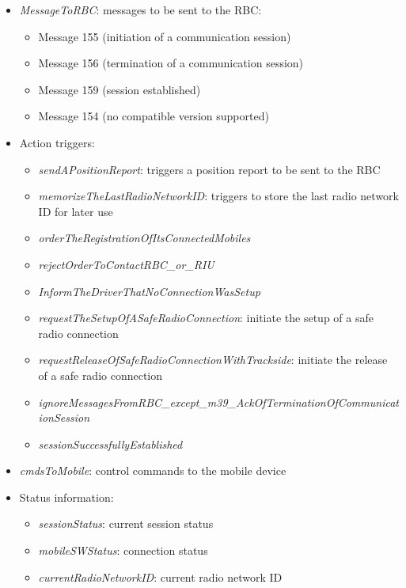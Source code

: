 \begin{itemize}
 \item \textit{MessageToRBC}: messages to be sent to the RBC: 

  \begin{itemize}
   \item Message 155 (initiation of a communication session)
   \item Message 156 (termination of a communication session)
   \item Message 159 (session established)
   \item Message 154 (no compatible version supported) 
  \end{itemize}

 \item Action triggers: 
 
  \begin{itemize}
   \item \textit{sendAPositionReport}: triggers a position report to be sent to the RBC
   \item \textit{memorizeTheLastRadioNetworkID}: triggers to store the last radio network ID for later use
   \item \textit{orderTheRegistrationOfItsConnectedMobiles}
   \item \textit{rejectOrderToContactRBC\_or\_RIU}
   \item \textit{InformTheDriverThatNoConnectionWasSetup}
   \item \textit{requestTheSetupOfASafeRadioConnection}: initiate the setup of a safe radio connection
   \item \textit{requestReleaseOfSafeRadioConnectionWithTrackside}: initiate the release of a safe radio connection
   \item \textit{ignoreMessagesFromRBC\_except\_m39\_AckOfTerminationOfCommunicationSession}
   \item \textit{sessionSuccessfullyEstablished}
  \end{itemize} 

 \item \textit{cmdsToMobile}: control commands to the mobile device
 
 \item Status information: 
 
  \begin{itemize}
   \item \textit{sessionStatus}: current session status
   \item \textit{mobileSWStatus}: connection status
   \item \textit{currentRadioNetworkID}: current radio network ID
  \end{itemize}
 
\end{itemize}

